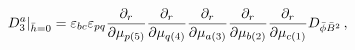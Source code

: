 \begin{equation*}
\left. D_{3}^{a}\right| _{\bar{h}=0}=\varepsilon _{bc}\varepsilon _{pq}\frac{%
\partial _{r}}{\partial \mu _{p(5)}}\frac{\partial _{r}}{\partial \mu _{q(4)}%
}\frac{\partial _{r}}{\partial \mu _{a(3)}}\frac{\partial _{r}}{\partial \mu
_{b(2)}}\frac{\partial _{r}}{\partial \mu _{c(1)}}D_{\bar{\phi}\bar{B}%
^{2}}\,,
\end{equation*}

